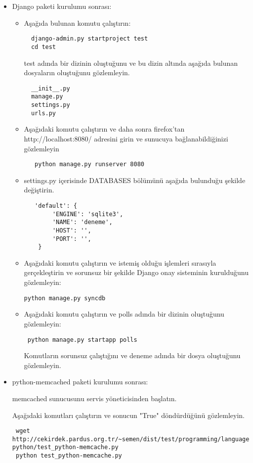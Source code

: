 \documentclass[a4paper,10pt]{article}
\begin{document}
\begin{itemize}
 \item Django paketi kurulumu sonrası:
\begin{itemize}
 \item Aşağıda bulunan komutu çalıştırın:
 \begin{verbatim}
  django-admin.py startproject test
  cd test
 \end{verbatim}
 test adında bir dizinin oluştuğunu ve bu dizin altında aşağıda bulunan dosyaların oluştuğunu gözlemleyin.
  \begin{verbatim}
  __init__.py
  manage.py
  settings.py
  urls.py 
  \end{verbatim}
 \item Aşağıdaki komutu çalıştırın ve daha sonra firefox'tan http://localhost:8080/ adresini girin ve sunucuya bağlanabildiğinizi gözlemleyin
  \begin{verbatim}
   python manage.py runserver 8080
  \end{verbatim}
 \item settings.py içerisinde DATABASES bölümünü aşağıda bulunduğu şekilde değiştirin. 

  \begin{verbatim}
   'default': {
        'ENGINE': 'sqlite3', 
        'NAME': 'deneme',    
        'HOST': '',          
        'PORT': '',        
    }
  \end{verbatim}
\item Aşağıdaki komutu çalıştırın ve istemiş olduğu işlemleri sırasıyla gerçekleştirin ve sorunsuz bir şekilde Django onay sisteminin kurulduğunu gözlemleyin:
\begin{verbatim}
python manage.py syncdb 
\end{verbatim}
\item Aşağıdaki komutu çalıştırın ve polls adında bir dizinin oluştuğunu gözlemleyin:
\begin{verbatim}
 python manage.py startapp polls 
\end{verbatim}

Komutların sorunsuz çalıştığını ve deneme adında bir dosya oluştuğunu gözlemleyin.
\end{itemize}

\item python-memcached paketi kurulumu sonrası:

memcached sunucusunu servis yöneticisinden başlatın.

Aşağıdaki komutları çalıştırın ve sonucun "True" döndürdüğünü gözlemleyin.
\begin{verbatim}
 wget http://cekirdek.pardus.org.tr/~semen/dist/test/programming/language/
python/test_python-memcache.py
 python test_python-memcache.py
\end{verbatim}


\end{itemize}
\end{document}
